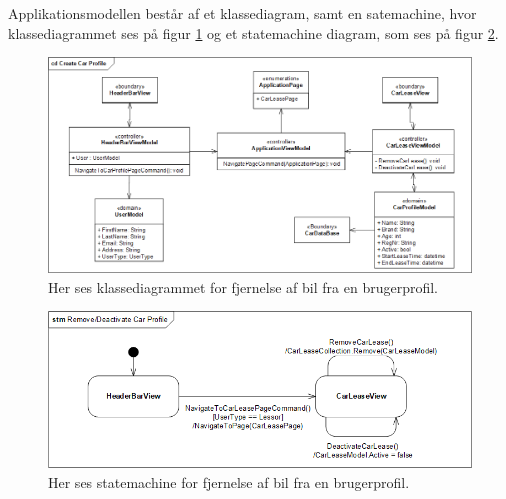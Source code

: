 \documentclass[Arkitektur/System_main.tex]{subfiles}
\begin{document}
Applikationsmodellen består af et klassediagram, samt en satemachine, hvor klassediagrammet ses på figur \ref{fig:RemoveDeactivateCarProfileCD} og et statemachine diagram, som ses på figur \ref{fig:RemoveDeactivateCarProfileSTM}.
\begin{figure}[H]
    \centering
    \includegraphics[width=1\textwidth]{Arkitektur/Softwarearkitektur/Car_registration/graphics/RemoveDeactivateCarProfileCD.png}
    \caption{Her ses klassediagrammet for fjernelse af bil fra en brugerprofil. }
    \label{fig:RemoveDeactivateCarProfileCD}
\end{figure}

\begin{figure}[H]
    \centering
    \includegraphics[width=1\textwidth]{Arkitektur/Softwarearkitektur/Car_registration/graphics/RemoveDeactivateCarProfileSTM.png}
    \caption{Her ses statemachine for fjernelse af bil fra en brugerprofil. }
    \label{fig:RemoveDeactivateCarProfileSTM}
\end{figure}
\end{document}

